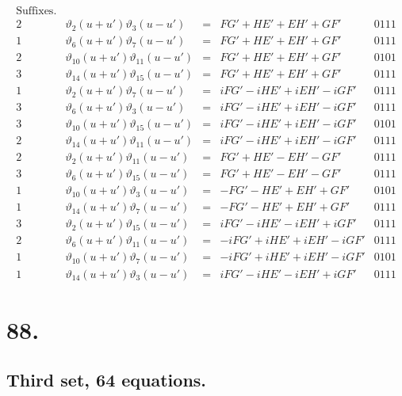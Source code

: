 \documentclass[11pt,a4paper]{article}
\newcommand{\uth}[1]{\vartheta_{#1}}
\begin{document}
\[
\begin{array}{ccccc}
\text{Suffixes.} & & & & \\
\hline
2 & \uth{2}(u+u')\uth{3}(u-u') &=& FG' + HE' + EH' + GF' & 0111 \\
1 & \uth{6}(u+u')\uth{7}(u-u') &=& FG' + HE' + EH' + GF' & 0111 \\
2 & \uth{10}(u+u')\uth{11}(u-u') &=& FG' + HE' + EH' + GF' & 0101 \\
3 & \uth{14}(u+u')\uth{15}(u-u') &=& FG' + HE' + EH' + GF' & 0111 \\
\hline
1 & \uth{2}(u+u')\uth{7}(u-u') &=& iFG' - iHE' + iEH' - iGF' & 0111 \\
3 & \uth{6}(u+u')\uth{3}(u-u') &=& iFG' - iHE' + iEH' - iGF' & 0111 \\
3 & \uth{10}(u+u')\uth{15}(u-u') &=& iFG' - iHE' + iEH' - iGF' & 0101 \\
2 & \uth{14}(u+u')\uth{11}(u-u') &=& iFG' - iHE' + iEH' - iGF' & 0111 \\
\hline
2 & \uth{2}(u+u')\uth{11}(u-u') &=& FG' + HE' - EH' - GF' & 0111 \\
3 & \uth{6}(u+u')\uth{15}(u-u') &=& FG' + HE' - EH' - GF' & 0111 \\
1 & \uth{10}(u+u')\uth{3}(u-u') &=& -FG' - HE' + EH' + GF' & 0101 \\
1 & \uth{14}(u+u')\uth{7}(u-u') &=& -FG' - HE' + EH' + GF' & 0111 \\
\hline
3 & \uth{2}(u+u')\uth{15}(u-u') &=& iFG' - iHE' - iEH' + iGF' & 0111 \\
2 & \uth{6}(u+u')\uth{11}(u-u') &=& -iFG' + iHE' + iEH' - iGF' & 0111 \\
1 & \uth{10}(u+u')\uth{7}(u-u') &=& -iFG' + iHE' + iEH' - iGF' & 0101 \\
1 & \uth{14}(u+u')\uth{3}(u-u') &=& iFG' - iHE' - iEH' + iGF' & 0111
\end{array}
\]

\newpage
\section*{88.}
\label{sec:88}

\subsection*{Third set, 64 equations.}
\end{document}

